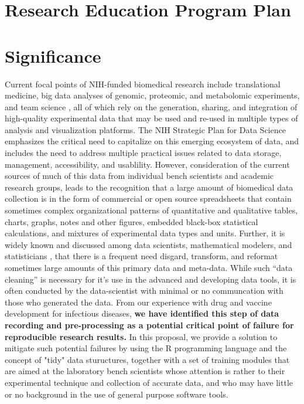 \documentclass[pdftex,english,11pt,parskip=half]{scrartcl}
\begin{document}
\def\bf{\normalfont\bfseries}
\pagestyle{empty}

\section*{Research Education Program Plan}

\section{Significance}
\vspace{-0.1in}

Current focal points of NIH-funded biomedical research include translational
medicine, big data analyses of genomic, proteomic, and metabolomic experiments,
and team science \cite{}, all of which rely on the generation, sharing, and
integration of high-quality experimental data that may be used and re-used in
multiple types of analysis and visualization platforms. The NIH Strategic Plan
for Data Science \cite{} emphasizes the critical need to capitalize on this
emerging ecosystem of data, and includes the need to address multiple practical
issues related to data storage, management, accessibility, and usablility.
However, consideration of the current sources of much of this data from
individual bench scientists and academic research groups, leads to the 
recognition that a large amount of biomedical data collection is in the form 
of commercial or open source spreadsheets that contain sometimes complex 
organizational
patterns of quantitative and qualitative tables, charts, graphs, notes and other
figures, embedded black-box statistical calculations, and mixtures of
experimental data types and units. Further, it is widely known and discussed
among data scientists, mathematical modelers, and statisticians \cite{}, that
there is a frequent need disgard, transform, and reformat sometimes large
amounts of this primary data and meta-data. While such ``data cleaning'' is
necessary for it's use in the advanced and developing data tools, it is often
conducted by the data-scientist with minimal or no communcation with those who
generated the data. From our experience with drug and vaccine development for
infectious diseases, \textbf{we have identified this step of data recording and
pre-processing as a potential critical point of failure for reproducible
research results.} In this proposal, we provide a solution to mitigate such
potential failures by using the R programming language and the concept of "tidy"
data stuructures, together with a set of training modules that are aimed at the
laboratory bench scientists whose attention is rather to their experimental
technique and collection of accurate data, and who may have little or no
background in the use of general purpose software tools.
\end{document}
